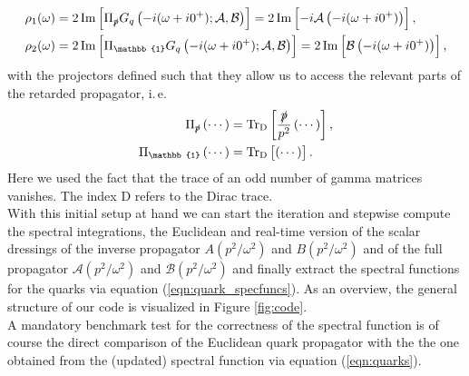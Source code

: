\begin{equation}
\begin{aligned}
	\rho_1(\omega) &= 2 \operatorname{Im}\left[\Pi_{\slashed{p}} G_{q}\left(-i(\omega + i0^+); \mathcal{A}, \mathcal{B}\right)\right] = 2 \operatorname{Im}\left[-i\mathcal{A}\left(-i(\omega + i0^+)\right)\right], \\
	\rho_2(\omega) &= 2 \operatorname{Im}\left[\Pi_{\mathbb{1}} G_{q}\left(-i(\omega + i0^+); \mathcal{A}, \mathcal{B}\right)\right]  = 2 \operatorname{Im}\left[\mathcal{B}\left(-i(\omega + i0^+)\right)\right],
\end{aligned}
\label{eqn:quark_specfuncs}
\end{equation}
with the projectors defined such that they allow us to access the relevant parts of the retarded propagator, i.\,e.
\begin{equation}
\begin{aligned}
	\Pi_{\slashed{p}}\left(\cdots\right) &= \operatorname{Tr}_{\mathrm{D}}\left[\frac{\slashed{p}}{p^2} \left(\cdots\right)\right],\\
	\Pi_{\mathbb{1}}\left(\cdots\right) &= \operatorname{Tr}_{\mathrm{D}}\left[\left(\cdots\right)\right].
\end{aligned}
\end{equation}
Here we used the fact that the trace of an odd number of gamma matrices vanishes. The index $\mathrm{D}$ refers to the Dirac trace.\\


\noindent With this initial setup at hand we can start the iteration and stepwise compute the spectral integrations, the Euclidean and real-time version of the scalar dressings of the inverse propagator $A(p^2/\omega^2)$ and $B(p^2/\omega^2)$ and of the full propagator $\mathcal{A}(p^2/\omega^2)$ and $\mathcal{B}(p^2/\omega^2)$ and finally extract the spectral functions for the quarks via equation (\ref{eqn:quark_specfuncs}). As an overview, the general structure of our code is visualized in Figure \ref{fig:code}. \\
A mandatory benchmark test for the correctness of the spectral function is of course the direct comparison of the Euclidean quark propagator with the the one obtained from the (updated) spectral function via equation (\ref{eqn:quarks}). 




